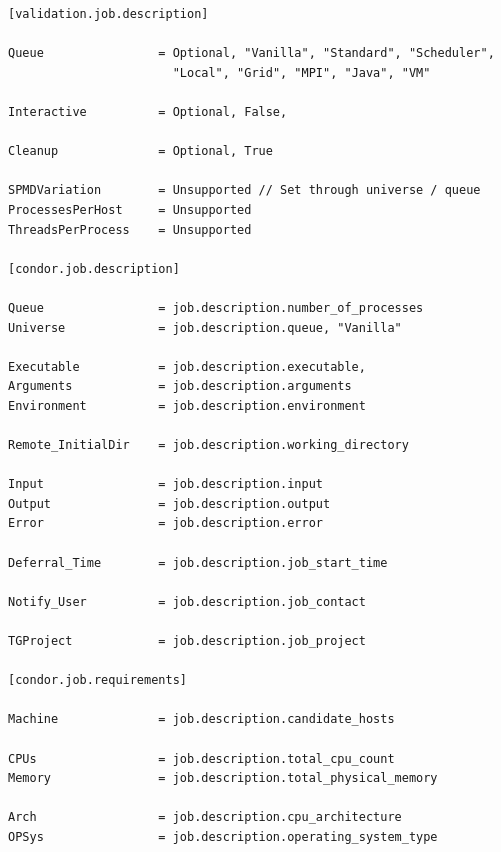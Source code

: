     { \small
    \begin{verbatim}
[validation.job.description]

Queue                = Optional, "Vanilla", "Standard", "Scheduler", 
                       "Local", "Grid", "MPI", "Java", "VM"

Interactive          = Optional, False, 

Cleanup              = Optional, True

SPMDVariation        = Unsupported // Set through universe / queue
ProcessesPerHost     = Unsupported
ThreadsPerProcess    = Unsupported

[condor.job.description]

Queue                = job.description.number_of_processes
Universe             = job.description.queue, "Vanilla"

Executable           = job.description.executable, 
Arguments            = job.description.arguments
Environment          = job.description.environment

Remote_InitialDir    = job.description.working_directory

Input                = job.description.input
Output               = job.description.output
Error                = job.description.error

Deferral_Time        = job.description.job_start_time

Notify_User          = job.description.job_contact

TGProject            = job.description.job_project

[condor.job.requirements]

Machine              = job.description.candidate_hosts

CPUs                 = job.description.total_cpu_count
Memory               = job.description.total_physical_memory

Arch                 = job.description.cpu_architecture
OPSys                = job.description.operating_system_type

    \end{verbatim}
    }

